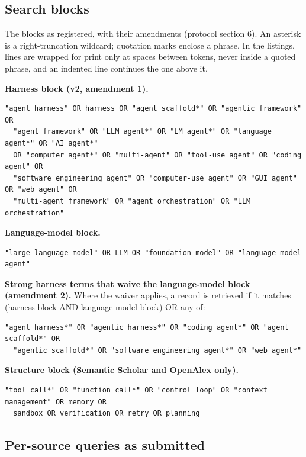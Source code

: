 \subsection{Search blocks}
\label{subsec:search-blocks}

The blocks as registered, with their amendments (protocol section 6). An asterisk is a
right-truncation wildcard; quotation marks enclose a phrase. In the listings, lines are wrapped for
print only at spaces between tokens, never inside a quoted phrase, and an indented line continues the
one above it.

\noindent\textbf{Harness block (v2, amendment 1).}
{\footnotesize
\begin{verbatim}
"agent harness" OR harness OR "agent scaffold*" OR "agentic framework" OR
  "agent framework" OR "LLM agent*" OR "LM agent*" OR "language agent*" OR "AI agent*"
  OR "computer agent*" OR "multi-agent" OR "tool-use agent" OR "coding agent" OR
  "software engineering agent" OR "computer-use agent" OR "GUI agent" OR "web agent" OR
  "multi-agent framework" OR "agent orchestration" OR "LLM orchestration"
\end{verbatim}
}

\noindent\textbf{Language-model block.}
{\footnotesize
\begin{verbatim}
"large language model" OR LLM OR "foundation model" OR "language model agent"
\end{verbatim}
}

\noindent\textbf{Strong harness terms that waive the language-model block (amendment 2).} Where the
waiver applies, a record is retrieved if it matches (harness block AND language-model block) OR any
of:
{\footnotesize
\begin{verbatim}
"agent harness*" OR "agentic harness*" OR "coding agent*" OR "agent scaffold*" OR
  "agentic scaffold*" OR "software engineering agent*" OR "web agent*"
\end{verbatim}
}

\noindent\textbf{Structure block (Semantic Scholar and OpenAlex only).}
{\footnotesize
\begin{verbatim}
"tool call*" OR "function call*" OR "control loop" OR "context management" OR memory OR
  sandbox OR verification OR retry OR planning
\end{verbatim}
}

\subsection{Per-source queries as submitted}
\label{subsec:search-queries}

